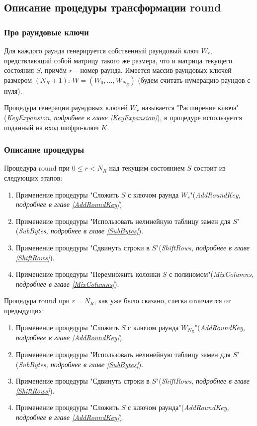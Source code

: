 \subsection{Описание процедуры трансформации round} \label{Round}

\subsubsection{Про раундовые ключи}
    Для каждого раунда генерируется собственный раундовый ключ $W_{r}$, предствляющий собой матрицу такого же размера,
    что и матрица текущего состояния $S$, причём $r$ -- номер раунда.
    Имеется массив раундовых ключей размером $(N_R + 1)$: $W = (W_{0}, \dots, W_{N_R})$
    (будем считать нумерацию раундов с нуля).

    Процедура генерации раундовых ключей $W_{r}$ называется "Расширение ключа" \\
    (\textit{KeyExpansion, подробнее в главе \ref{KeyExpansion}}), в процедуре используется поданный на вход
    шифро-ключ $K$.

    \subsubsection{Описание процедуры} \label{RoundDescription}
    Процедура round при $0 \leq r < N_R$ над текущим состоянием $S$ состоит из следующих этапов:
    \begin{enumerate}
        \item Применение процедуры "Сложить $S$ с ключом раунда $W_{r}$"\;(\textit{AddRoundKey, подробнее в главе \ref{AddRoundKey}}).
        \item Применение процедуры "Использовать нелинейную таблицу замен для $S$"\;(\textit{SubBytes, подробнее в главе \ref{SubBytes}}).
        \item Применение процедуры "Сдвинуть строки в $S$"\;(\textit{ShiftRows, подробнее в главе \ref{ShiftRows}}).
        \item Применение процедуры "Перемножить колонки $S$ с полиномом"\;(\textit{MixColumns, подробнее в главе \ref{MixColumns}}).
    \end{enumerate}

    Процедура round при $r = N_R$, как уже было сказано, слегка отличается от предыдущих:
    \begin{enumerate}
        \item Применение процедуры "Сложить $S$ с ключом раунда $W_{N_R}$"\;(\textit{AddRoundKey, подробнее в главе \ref{AddRoundKey}}).
        \item Применение процедуры "Использовать нелинейную таблицу замен для $S$"\;(\textit{SubBytes, подробнее в главе \ref{SubBytes}}).
        \item Применение процедуры "Сдвинуть строки в $S$"\;(\textit{ShiftRows, подробнее в главе \ref{ShiftRows}}).
        \item Применение процедуры "Сложить $S$ с ключом раунда"\;(\textit{AddRoundKey, подробнее в главе \ref{AddRoundKey}}).
    \end{enumerate}


